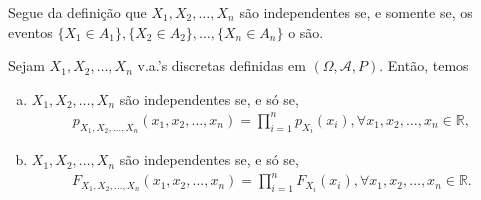 \documentclass[../Notas.tex]{subfiles}
\begin{document}
\begin{remark}
Segue da definição que $X_1, X_2, \dots, X_n$ são independentes se, e somente se, os eventos $\{ X_1\in A_1 \}, \{X_2\in A_2\}, \dots, \{X_n\in A_n\}$ o são.
\end{remark}

\begin{proposition}
Sejam $X_1, X_2, \dots, X_n$ v.a.'s discretas definidas em $(\Omega, \mathcal{A}, P)$. Então, temos
\begin{enumerate}[(a)]
    \item $X_1, X_2, \dots, X_n$ são independentes se, e só se, 
    \begin{align*}
        p_{X_1, X_2, \dots, X_n}(x_1, x_2, \dots, x_n) = \prod_{i=1}^{n}p_{X_i}(x_i), \forall x_1, x_2, \dots, x_n\in\mathbb{R},
    \end{align*}
    \item $X_1, X_2, \dots, X_n$ são independentes se, e só se,
    \begin{align*}
        F_{X_1, X_2, \dots, X_n}(x_1, x_2, \dots, x_n) = \prod_{i=1}^{n}F_{X_i}(x_i), \forall x_1, x_2, \dots, x_n\in\mathbb{R}.
    \end{align*}
\end{enumerate}
\end{proposition}
\end{document}
